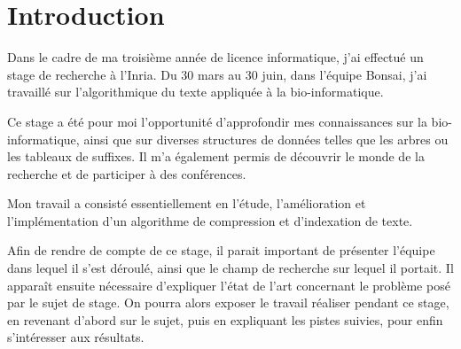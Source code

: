 \section*{Introduction} %

Dans le cadre de ma troisième année de licence informatique, j'ai effectué un stage de recherche à l'Inria. Du 30 mars au 30 juin, dans l'équipe Bonsai, j'ai travaillé sur l'algorithmique du texte appliquée à la bio-informatique.

Ce stage a été pour moi l'opportunité d'approfondir mes connaissances sur la bio-informatique, ainsi que sur diverses structures de données telles que les arbres ou les tableaux de suffixes. Il m'a également permis de découvrir le monde de la recherche et de participer à des conférences.

Mon travail a consisté essentiellement en l'étude, l'amélioration et l'implémentation d'un algorithme de compression et d'indexation de texte.


Afin de rendre de compte de ce stage, il parait important de présenter l'équipe dans lequel il s'est déroulé, ainsi que le champ de recherche sur lequel il portait. Il apparaît ensuite nécessaire d'expliquer l'état de l'art concernant le problème posé par le sujet de stage. On pourra alors exposer le travail réaliser pendant ce stage, en revenant d'abord sur le sujet, puis en expliquant les pistes suivies, pour enfin s'intéresser aux résultats.